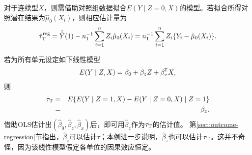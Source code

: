 对于连续型$X$，则需借助对照组数据拟合$E(Y\mid Z=0, X)$的模型。若拟合所得对照潜在结果为$\hat{\mu}_0(X_i)$，则相应估计量为
$$
\hat{\tau}_\textsc{T}^\text{reg} =  \hat{\bar{Y}}(1) - n_1^{-1} \sum_{i=1}^n Z_i \hat{\mu}_0(X_i) = n_1^{-1} \sum_{i=1}^n Z_i  \{  Y_i - \hat{\mu}_0(X_i)  \}. 
$$


\begin{example}\label{eg::att-regression1}
若为所有单元设定如下线性模型
$$
E(Y\mid Z, X) = \beta_0  + \beta_z  Z + \beta_x^{\mkern-1.5mu\mathsf{T}} X,
$$
则
\begin{eqnarray*}
\tau_\textsc{T} &=& E\{   E(Y\mid Z=1, X)  -  E(    Y \mid Z=0 , X)  \mid Z=1\} \\
&=&  \beta_z.
\end{eqnarray*}
借助OLS估计出$( \hat{\beta}_0, \hat{\beta}_z,  \hat{\beta}_x )$后，即可用$\hat{\beta}_z$作为$\tau_\textsc{T} $的估计值。 
%
%
第\ref{sec::outcome-regression}节指出，$\hat{\beta}_z$可以估计$\tau$；本例进一步说明，$\hat{\beta}_z$也可以估计$\tau_\textsc{T}$。这并不奇怪，因为该线性模型假定各单位的因果效应恒定。 
\end{example}


